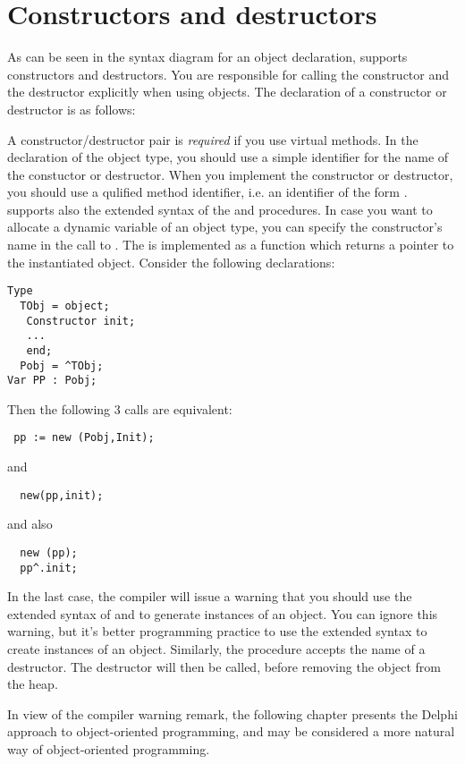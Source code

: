 \documentclass{report}
\begin{document}
\section{Constructors and destructors }
\label{se:constructdestruct}
As can be seen in the syntax diagram for an object declaration, \fpc supports
constructors and destructors. You are responsible for calling the
constructor and the destructor explicitly when using objects.
The declaration of a constructor or destructor is as follows:

A constructor/destructor pair is {\em required} if you use virtual methods.
In the declaration of the object type, you should use a simple identifier
for the name of the constuctor or destructor. When you implement the
constructor or destructor, you should use a qulified method identifier,
i.e. an identifier of the form .
\fpc supports also the extended syntax of the  and 
procedures. In case you want to allocate a dynamic variable of an object
type, you can specify the constructor's name in the call to .
The  is implemented as a function which returns a pointer to the
instantiated object. Consider the following declarations:
\begin{verbatim}
Type
  TObj = object;
   Constructor init;
   ...
   end;
  Pobj = ^TObj;
Var PP : Pobj;
\end{verbatim}
Then the following 3 calls are equivalent:
\begin{verbatim}
 pp := new (Pobj,Init);
\end{verbatim}
and
\begin{verbatim}
  new(pp,init);
\end{verbatim}
and also
\begin{verbatim}
  new (pp);
  pp^.init;
\end{verbatim}
In the last case, the compiler will issue a warning that you should use the
extended syntax of  and  to generate instances of an
object. You can ignore this warning, but it's better programming practice to
use the extended syntax to create instances of an object.
Similarly, the  procedure accepts the name of a destructor. The
destructor will then be called, before removing the object from the heap.

In view of the compiler warning remark, the following chapter presents the
Delphi approach to object-oriented programming, and may be considered a 
more natural way of object-oriented programming.
\end{document}
